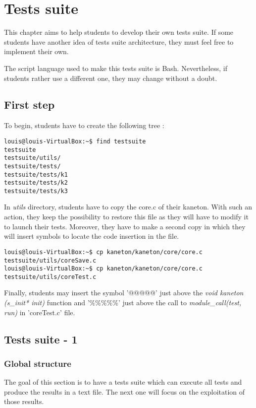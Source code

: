 \chapter{Tests suite}
\label{chapter:Tests suite}

This chapter aims to help students to develop their own tests suite. If some students have another idea of tests suite architecture, they must feel free to implement their own.

The script language used to make this tests suite is Bash. Nevertheless, if students rather use a different one, they may change without a doubt.

\section{First step}
To begin, students have to create the following tree :
\begin{verbatim}
louis@louis-VirtualBox:~$ find testsuite
testsuite
testsuite/utils/
testsuite/tests/
testsuite/tests/k1
testsuite/tests/k2
testsuite/tests/k3
\end{verbatim}

In \textit{utils} directory, students have to copy the core.c of their kaneton. With such an action, they keep the possibility to restore this file as they will have to modify it to launch their tests. Moreover, they have to make a second copy in which they will insert symbols to locate the code insertion in the file.

\begin{verbatim}
louis@louis-VirtualBox:~$ cp kaneton/kaneton/core/core.c testsuite/utils/coreSave.c
louis@louis-VirtualBox:~$ cp kaneton/kaneton/core/core.c testsuite/utils/coreTest.c
\end{verbatim}

Finally, students may insert the symbol '@@@@@' just above the \textit{void kaneton (s\_init* init)} function and '\%\%\%\%\%'  just above the call to \textit{module\_call(test, run)} in 'coreTest.c' file.

\section{Tests suite - 1}
\subsection{Global structure}
The goal of this section is to have a tests suite which can execute all tests and produce the results in a text file. The next one will focus on the exploitation of those results.

